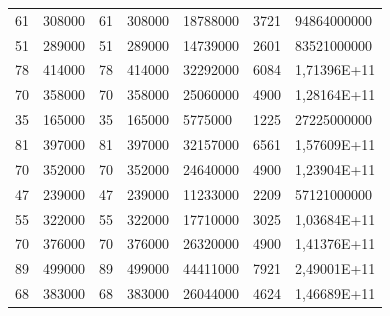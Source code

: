 \documentclass[a4paper]{scrreprt}
\begin{document}
\begin{enumerate}
\begin{table}
\begin{tiny}
\begin{tabular}{lllllll}
61                    & 308000                 & 61                  & 308000              & 18788000                                    & 3721                    & 94864000000             \\
51                    & 289000                 & 51                  & 289000              & 14739000                                    & 2601                    & 83521000000             \\
78                    & 414000                 & 78                  & 414000              & 32292000                                    & 6084                    & 1,71396E+11             \\
70                    & 358000                 & 70                  & 358000              & 25060000                                    & 4900                    & 1,28164E+11             \\
35                    & 165000                 & 35                  & 165000              & 5775000                                     & 1225                    & 27225000000             \\
81                    & 397000                 & 81                  & 397000              & 32157000                                    & 6561                    & 1,57609E+11             \\
70                    & 352000                 & 70                  & 352000              & 24640000                                    & 4900                    & 1,23904E+11             \\
47                    & 239000                 & 47                  & 239000              & 11233000                                    & 2209                    & 57121000000             \\
55                    & 322000                 & 55                  & 322000              & 17710000                                    & 3025                    & 1,03684E+11             \\
70                    & 376000                 & 70                  & 376000              & 26320000                                    & 4900                    & 1,41376E+11             \\
89                    & 499000                 & 89                  & 499000              & 44411000                                    & 7921                    & 2,49001E+11             \\
68                    & 383000                 & 68                  & 383000              & 26044000                                    & 4624                    & 1,46689E+11             \\

\end{tabular}
\end{tiny}
\end{table}
\end{enumerate}
\end{document}
